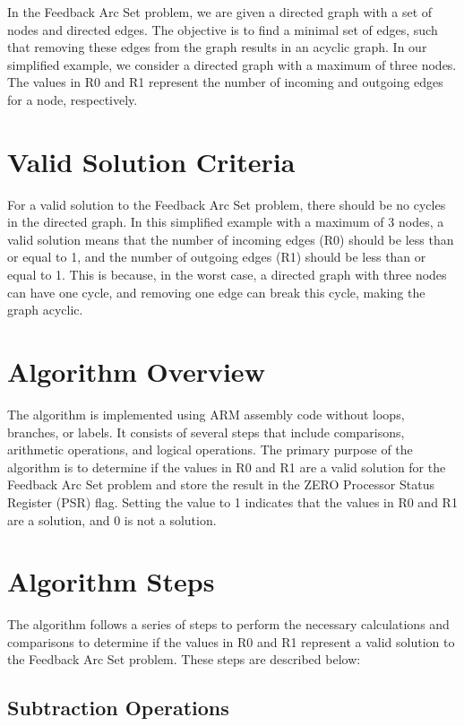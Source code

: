 In the Feedback Arc Set problem, we are given a directed graph with a set of nodes and directed edges. The objective is to find a minimal set of edges, such that removing these edges from the graph results in an acyclic graph. In our simplified example, we consider a directed graph with a maximum of three nodes. The values in R0 and R1 represent the number of incoming and outgoing edges for a node, respectively.

\section{Valid Solution Criteria}

For a valid solution to the Feedback Arc Set problem, there should be no cycles in the directed graph. In this simplified example with a maximum of 3 nodes, a valid solution means that the number of incoming edges (R0) should be less than or equal to 1, and the number of outgoing edges (R1) should be less than or equal to 1. This is because, in the worst case, a directed graph with three nodes can have one cycle, and removing one edge can break this cycle, making the graph acyclic.

\section{Algorithm Overview}

The algorithm is implemented using ARM assembly code without loops, branches, or labels. It consists of several steps that include comparisons, arithmetic operations, and logical operations. The primary purpose of the algorithm is to determine if the values in R0 and R1 are a valid solution for the Feedback Arc Set problem and store the result in the ZERO Processor Status Register (PSR) flag. Setting the value to 1 indicates that the values in R0 and R1 are a solution, and 0 is not a solution.

\section{Algorithm Steps}

The algorithm follows a series of steps to perform the necessary calculations and comparisons to determine if the values in R0 and R1 represent a valid solution to the Feedback Arc Set problem. These steps are described below:

\subsection{Subtraction Operations}

